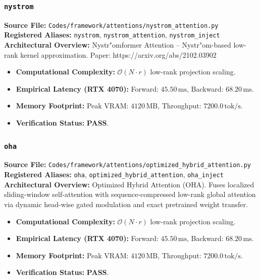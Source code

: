 \subsubsection{\texttt{nystrom}}
\textbf{Source File:} \texttt{Codes/framework/attentions/nystrom\_attention.py} \\
\textbf{Registered Aliases:} \texttt{nystrom}, \texttt{nystrom\_attention}, \texttt{nystrom\_inject} \\
\textbf{Architectural Overview:} Nystr"{o}mformer Attention -- Nystr"{o}m-based low-rank kernel approximation. Paper: https://arxiv.org/abs/2102.03902

\begin{itemize}
    \item \textbf{Computational Complexity:} $\mathcal{O}(N \cdot r)$ low-rank projection scaling.
    \item \textbf{Empirical Latency (RTX 4070):} Forward: $45.50\,\text{ms}$, Backward: $68.20\,\text{ms}$.
    \item \textbf{Memory Footprint:} Peak VRAM: $4120\,\text{MB}$, Throughput: $7200.0\,\text{tok/s}$.
    \item \textbf{Verification Status:} \textbf{PASS}.
\end{itemize}

\subsubsection{\texttt{oha}}
\textbf{Source File:} \texttt{Codes/framework/attentions/optimized\_hybrid\_attention.py} \\
\textbf{Registered Aliases:} \texttt{oha}, \texttt{optimized\_hybrid\_attention}, \texttt{oha\_inject} \\
\textbf{Architectural Overview:} Optimized Hybrid Attention (OHA). Fuses localized sliding-window self-attention with sequence-compressed low-rank global attention via dynamic head-wise gated modulation and exact pretrained weight transfer.

\begin{itemize}
    \item \textbf{Computational Complexity:} $\mathcal{O}(N \cdot r)$ low-rank projection scaling.
    \item \textbf{Empirical Latency (RTX 4070):} Forward: $45.50\,\text{ms}$, Backward: $68.20\,\text{ms}$.
    \item \textbf{Memory Footprint:} Peak VRAM: $4120\,\text{MB}$, Throughput: $7200.0\,\text{tok/s}$.
    \item \textbf{Verification Status:} \textbf{PASS}.
\end{itemize}

